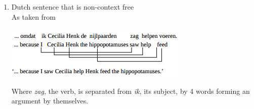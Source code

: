 \documentclass[12pt]{article}
\newenvironment{exercise}[2][Exercise]{\begin{trivlist}
\item[\hskip \labelsep {\bfseries #1}\hskip \labelsep {\bfseries #2.}]}{\end{trivlist}}
\begin{document}
\begin{exercise}{6}
\begin{enumerate}[label=(\alph*), leftmargin=0mm]
\item Dutch sentence that is non-context free \\

As taken from \cite{steedman2011combinatory}

\includegraphics{dutch_dependency.png}

Where \textit{zag}, the verb, is separated from \textit{ik}, its subject, by  4 words forming an argument by themselves. 

\end{enumerate}
\end{exercise}
 

 
 
 
\end{document}
